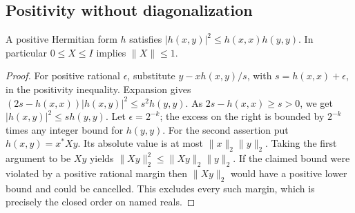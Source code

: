 \subsection{Positivity without diagonalization}

\begin{lemma}\label{lem:q-forms}
A positive Hermitian form \(h\) satisfies
\( |h(x,y)|^2\le h(x,x)h(y,y)\).
In particular \(0\le X\le I\) implies \(\|X\|\le1\).
\end{lemma}
\begin{proof}
For positive rational \(\epsilon\), substitute
\(y-xh(x,y)/s\), with \(s=h(x,x)+\epsilon\), in the positivity
inequality. Expansion gives
\((2s-h(x,x))|h(x,y)|^2\le s^2 h(y,y)\).
As \(2s-h(x,x)\ge s>0\), we get \(|h(x,y)|^2\le s h(y,y)\).
Let \(\epsilon=2^{-k}\); the excess on the right is bounded by
\(2^{-k}\) times any integer bound for \(h(y,y)\). For the second
assertion put \(h(x,y)=x^*Xy\). Its absolute value is at most
\(\|x\|_2\|y\|_2\). Taking the first argument to be \(Xy\) yields
\(\|Xy\|_2^2\le\|Xy\|_2\|y\|_2\). If the claimed bound were violated
by a positive rational margin then \(\|Xy\|_2\) would have a positive
lower bound and could be cancelled. This excludes every such margin,
which is precisely the closed order on named reals.
\end{proof}

